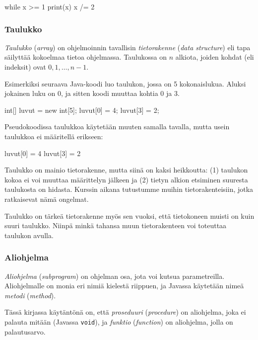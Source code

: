 \begin{code}
while x >= 1
    print(x)
    x /= 2
\end{code}

\subsubsection{Taulukko}


\emph{Taulukko} (\emph{array}) on ohjelmoinnin tavallisin \emph{tietorakenne}
(\emph{data structure})
eli tapa säilyttää kokoelmaa tietoa ohjelmassa.
Taulukossa on $n$ alkiota, joiden kohdat (eli indeksit) ovat $0,1,\dots,n-1$.

Esimerkiksi seuraava Java-koodi luo taulukon,
jossa on 5 kokonaislukua. Aluksi jokainen luku on 0,
ja sitten koodi muuttaa kohtia 0 ja 3.

\begin{code}
int[] luvut = new int[5];
luvut[0] = 4;
luvut[3] = 2;
\end{code}

Pseudokoodissa taulukkoa käytetään muuten samalla tavalla,
mutta usein taulukkoa ei määritellä erikseen:

\begin{code}
luvut[0] = 4
luvut[3] = 2
\end{code}

Taulukko on mainio tietorakenne, mutta siinä on kaksi heikkoutta:
(1) taulukon kokoa ei voi muuttaa määrittelyn jälkeen ja
(2) tietyn alkion etsiminen suuresta taulukosta on hidasta.
Kurssin aikana tutustumme muihin tietorakenteisiin,
jotka ratkaisevat nämä ongelmat.

Taulukko on tärkeä tietorakenne myös sen vuoksi,
että tietokoneen muisti on kuin suuri taulukko.
Niinpä minkä tahansa muun tietorakenteen voi toteuttaa
taulukon avulla.

\subsubsection{Aliohjelma}


\emph{Aliohjelma} (\emph{subprogram}) on ohjelman osa, jota voi kutsua parametreilla.
Aliohjelmalle on monia eri nimiä kielestä riippuen,
ja Javassa käytetään nimeä \emph{metodi} (\emph{method}).

Tässä kirjassa käytäntönä on,
että \emph{proseduuri} (\emph{procedure}) on aliohjelma,
joka ei palauta mitään (Javassa \texttt{void}),
ja \emph{funktio} (\emph{function}) on aliohjelma,
jolla on palautusarvo.

